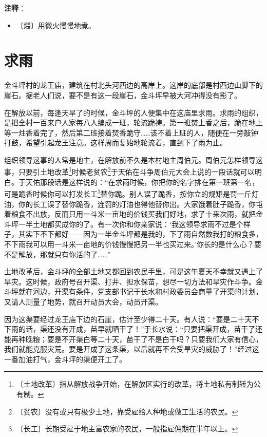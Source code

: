 \documentclass[12pt,UTF-8,openany]{ctexbook}
\begin{document}
\newpage

\textbf{注释}：

\vspace{-1em}

\begin{itemize}
    \setlength\itemsep{-0.2em}
    \item 〔煨〕用微火慢慢地煮。
\end{itemize}

\chapter{求雨}

\begin{normalsize}
    
    金斗坪村的龙王庙，建筑在村北头河西边的高岸上。这岸的底部是村西边山脚下的崖石。据老人们说，要不是有这一段崖石，金斗坪早被大河冲得没有影了。
    
    在解放以前，每逢天旱了的时候，金斗坪的人便集中在这庙里求雨。求雨的组织，是把全村一百来户人家每八人编成一班，轮流跪祷。第一班焚上香之后，跪在地上等一炷香着完了，然后第二班接着焚香跪守……该不着上班的人，随便在一旁敲钟打鼓，希望引起龙王注意。这样周而复始地轮流着，直到下了雨为止。
    
    组织领导这事的人常是地主，在解放前不久是本村地主周伯元。周伯元怎样领导这事，只要引土地改革\footnote{〔土地改革〕指从解放战争开始，在解放区实行的改革，将土地私有制转为公有制。}时候老贫农\footnote{〔贫农〕没有或只有极少土地，靠受雇给人种地或做工生活的农民。}于天佑在斗争周伯元大会上说的一段话就可以明白。于天佑那段话是这样说的：“在求雨时候，你把你的名字排在第一班第一名，可是跪香时候你可以打发长工\footnote{〔长工〕长期受雇于地主富农家的农民，一般指雇佣期在半年以上。}替你跪。别人误了跪香，按你立的规矩是罚一斤灯油，你的长工误了替你跪香，连罚的灯油也得他替你出。大家饿着肚子跪香，你屯着粮食不出放，反而只用一斗米一亩地的价钱买我们好地，求了十来次雨，就把金斗坪一半土地都买成你的了。有一次你和你亲家说：‘我这领导求雨不过是个样子，其实下不下都好——因为一半金斗坪都是我的，下了雨自然数我打的粮食多，不下雨我可以用一斗米一亩地的价钱慢慢把另一半也买过来。’你长的是什么心？要不是解放，那就只有你活的了……”
    
    土地改革后，金斗坪的全部土地又都回到农民手里，可是这午夏天不幸就又遇上了旱灾。这时候，政府号召开渠、打井、担水保苗，想尽一切方法和旱灾作斗争。金斗坪就在河边，开渠有条件，党支部书记于长水和村政委员会商量了开渠的计划，又请人测量了地势，就召开动员大会，动员开渠。
    
    因为这渠要经过龙王庙下边的石崖，估计至少得二十天。有人说：“要是二十天不下雨的话，渠还没有开成，苗早就晒干了！”于长水说：“只要把渠开成，苗干了还能再种晚粮；要是不开渠白等二十天，苗干了不是白干吗？只要我们大家有信心，我们就能克服灾荒。要是开成了这条渠，以后就再不会受旱灾的威胁了！”经过这一番加油打气，金斗坪的渠便开工了。
    

\end{normalsize}
\end{document}
